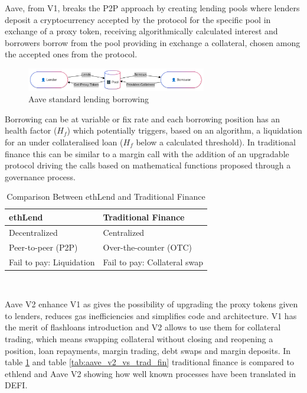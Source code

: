 \documentclass[11pt,a4paper,titlepage]{scrartcl}
\begin{document}
Aave, from V1, breaks the P2P approach by creating lending pools where lenders deposit a cryptocurrency accepted by the protocol for the specific pool in exchange of a proxy token, receiving algorithmically calculated interest and borrowers borrow from the pool providing in exchange a collateral, chosen among the accepted ones from the protocol.
\begin{figure}[ht]
    \includegraphics[width=0.7\textwidth]{image/lenderborrower.png}
    \caption{Aave standard lending borrowing}
\end{figure}
Borrowing can be at variable or fix rate and each borrowing position has an health factor ($H_f$) which potentially triggers, based on an algorithm, a liquidation for an under collateralised loan ($H_f$ below a calculated threshold). In traditional finance this can be similar to a margin call  with the addition of an upgradable protocol driving the calls based on mathematical functions proposed through a governance process.

\begin{table}[ht]
\centering
\caption{Comparison Between ethLend and Traditional Finance}
\begin{tabular}{ll}\toprule
\textbf{ethLend} & \textbf{Traditional Finance} \\ \midrule
Decentralized     & Centralized                \\
Peer-to-peer (P2P) & Over-the-counter (OTC)     \\
Fail to pay: Liquidation & Fail to pay: Collateral swap \\ \bottomrule
\end{tabular}\\
\label{tab:ethlend_vs_trad_fin}
\end{table}

Aave V2 enhance V1 as gives the possibility of upgrading the proxy tokens given to lenders, reduces gas inefficiencies and simplifies code and architecture.
V1 has the merit of flashloans introduction and V2 allows to use them for collateral trading, which means swapping collateral without closing and reopening a position, loan repayments, margin trading, debt swaps and margin deposits. In table  \ref{tab:ethlend_vs_trad_fin} and table
 \ref{tab:aave_v2_vs_trad_fin} traditional finance is compared to ethlend and Aave V2 showing how well known processes have been translated in DEFI. 
\end{document}
